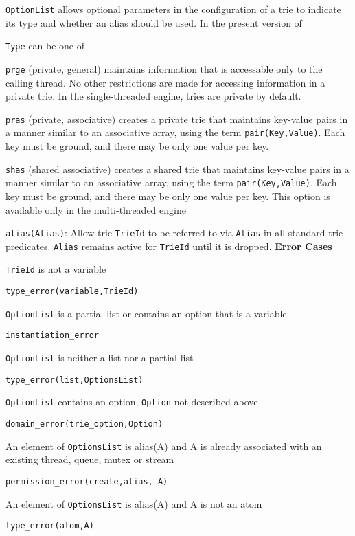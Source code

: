 \begin{description}
%
%
{\tt OptionList} allows optional parameters in the configuration of a
trie to indicate its type and whether an alias should be used.  In the
present version of  
\bi
\item {\tt Type} can be one of
\bi
\item {\tt prge} (private, general) maintains information that is
  accessable only to the calling thread.  No other restrictions are
  made for accessing information in a private trie.  In the
  single-threaded engine, tries are private by default.

\item {\tt pras} (private, associative) creates a private trie that
  maintains key-value pairs in a manner similar to an associative
  array, using the term {\tt pair(Key,Value)}.  Each key must be ground,
  and there may be only one value per key.

\item {\tt shas} (shared associative) creates a shared trie that
  maintains key-value pairs in a manner similar to an associative
  array, using the term {\tt pair(Key,Value)}.  Each key must be
  ground, and there may be only one value per key.  This option is
  available only in the multi-threaded engine

\ei
\item {\tt alias(Alias)}: Allow trie {\tt TrieId} to be referred to
  via {\tt Alias} in all standard trie predicates.  {\tt Alias}
  remains active for {\tt TrieId} until it is dropped.
\ei
%
{\bf Error Cases}
\bi
\item 	{\tt TrieId} is not a variable
\bi
\item 	{\tt type\_error(variable,TrieId)}
\ei
\item 	{\tt OptionList} is a partial list or contains an option that is a variable
\bi
\item 	{\tt instantiation\_error}
\ei
\item 	{\tt OptionList} is neither a list nor a partial list
\bi
\item 	{\tt type\_error(list,OptionsList)}
\ei
\item 	{\tt OptionList} contains an option, {\tt Option} not described above
\bi
\item 	{\tt domain\_error(trie\_option,Option)}
\ei
\item An element of {\tt OptionsList} is alias(A) and A is already
  associated with an existing thread, queue, mutex or stream 
\bi
\item {\tt permission\_error(create,alias, A)}
\ei
\item An element of {\tt OptionsList} is alias(A) and A is not an atom
\bi
\item {\tt type\_error(atom,A)}
\ei
\ei


\end{description}
